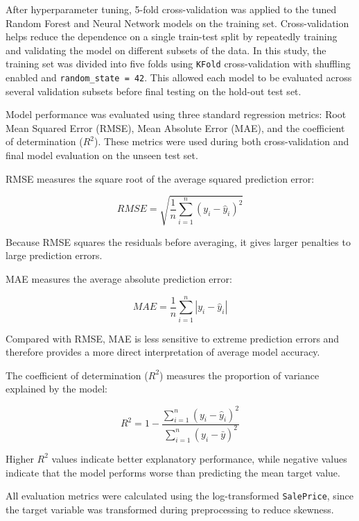 \documentclass[12pt,a4paper,oneside,openany]{book}
\begin{document}
After hyperparameter tuning, 5-fold cross-validation was applied to the tuned Random Forest and Neural Network models on the training set. Cross-validation helps reduce the dependence on a single train-test split by repeatedly training and validating the model on different subsets of the data. In this study, the training set was divided into five folds using \texttt{KFold} cross-validation with shuffling enabled and \texttt{random\_state = 42}. This allowed each model to be evaluated across several validation subsets before final testing on the hold-out test set.

Model performance was evaluated using three standard regression metrics: Root Mean Squared Error (RMSE), Mean Absolute Error (MAE), and the coefficient of determination ($R^2$). These metrics were used during both cross-validation and final model evaluation on the unseen test set.

RMSE measures the square root of the average squared prediction error:

\begin{equation}
RMSE = \sqrt{\frac{1}{n}\sum_{i=1}^{n}(y_i-\hat{y}_i)^2}
\end{equation}

Because RMSE squares the residuals before averaging, it gives larger penalties to large prediction errors.

MAE measures the average absolute prediction error:

\begin{equation}
MAE = \frac{1}{n}\sum_{i=1}^{n}|y_i-\hat{y}_i|
\end{equation}

Compared with RMSE, MAE is less sensitive to extreme prediction errors and therefore provides a more direct interpretation of average model accuracy.

The coefficient of determination ($R^2$) measures the proportion of variance explained by the model:

\begin{equation}
R^2 = 1 - \frac{\sum_{i=1}^{n}(y_i-\hat{y}_i)^2}{\sum_{i=1}^{n}(y_i-\bar{y})^2}
\end{equation}

Higher $R^2$ values indicate better explanatory performance, while negative values indicate that the model performs worse than predicting the mean target value.

All evaluation metrics were calculated using the log-transformed \texttt{SalePrice}, since the target variable was transformed during preprocessing to reduce skewness.
\end{document}
